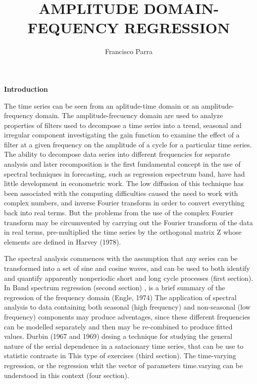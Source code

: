 \documentclass{article}\usepackage[]{graphicx}\usepackage[]{color}
\begin{document}
\title{AMPLITUDE DOMAIN-FEQUENCY REGRESSION }
\author{Francisco Parra}
\maketitle


\vspace{1.5cm}

{\bf Introduction}

The time series can be seen from an aplitude-time domain or an amplitude-frequency domain. The amplitude-frecuency domain are used to analyze properties of filters used to decompose a time series into a trend, seasonal and irregular component investigating the gain function to examine the effect of a filter at a given frequency on the amplitude of a cycle for a particular time series. The ability to decompose data series into different frequencies for separate analysis and later recomposition is the first fundamental concept in the use of spectral techniques in forecasting, such as regression espectrum band, have had little development in econometric work. The low diffusion of this technique has been associated with  the computing difficulties  caused the need to work with complex numbers, and  inverse Fourier transform in order to convert everything back into real terms. But the problems from the use of the complex Fourier transform may be circumvented by carrying out the Fourier transform of the data in real terms, pre-multiplied  the time series by the orthogonal matrix Z whose elements are defined in Harvey (1978).

The spectral analysis commences with the assumption that any series can be transformed into a set of sine and cosine waves, and can be used to both identify and quantify apparently nonperiodic short and long cycle processes  (first section). In  Band spectrum regression (second section) , is a brief summary  of the regression of the frequency domain  (Engle, 1974)  The application of spectral analysis to data containing both seasonal (high frequency) and non-seasonal (low frequency) components may produce adventages, since these different frequencies can be modelled separately and then may be re-combined to produce fitted values. Durbin (1967 and 1969) desing a technique for studying the general nature of the serial dependence in a satacionary time series, that can be use to statistic contraste in This type of exercises (third section). The time-varying regression, or the regression whit the vector of parameters time.varying can be understood in this context (four section). 
\end{document}
